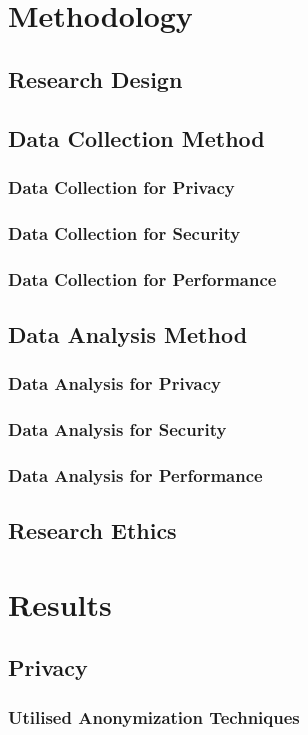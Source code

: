 \documentclass[12pt,conference]{IEEEtran}
\begin{document}
\newpage
\section{Methodology}
\subsection{Research Design}
\subsection{Data Collection Method}
\subsubsection{Data Collection for Privacy}
\subsubsection{Data Collection for Security}
\subsubsection{Data Collection for Performance}
\subsection{Data Analysis Method}
\subsubsection{Data Analysis for Privacy}
\subsubsection{Data Analysis for Security}
\subsubsection{Data Analysis for Performance}
\subsection{Research Ethics}

\section{Results}
\subsection{Privacy}
\subsubsection{Utilised Anonymization Techniques}
\end{document}
